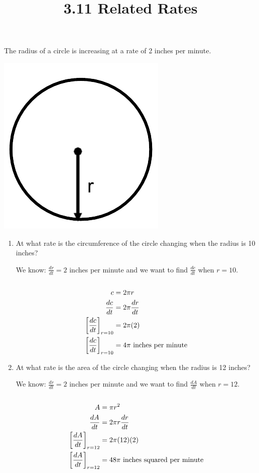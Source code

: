 \documentclass[nooutcomes,handout]{ximera}
\title{3.11 Related Rates}
\begin{document}
\begin{abstract}		\end{abstract}
\maketitle


\begin{problem}
The radius of a circle is increasing at a rate of 2 inches per minute. 
	\begin{image}
	\includegraphics[scale=.5]{Figure2.png}
	\end{image}

\begin{enumerate}
	\item At what rate is the circumference of the circle changing when the radius is 10 inches?
	\begin{freeResponse}
	We know: ${\frac{dr}{dt}}=2$ inches per minute and we want to find ${\frac{dc}{dt}}$ when $r=10$.\\\\
	\begin{align*}
	c&=2\pi r\\
	{\frac{dc}{dt}}&=2\pi {\frac{dr}{dt}}\\
	\bigg[ {\frac{dc}{dt}} \bigg]_{r=10}&=2 \pi (2)\\
	\bigg[ {\frac{dc}{dt}} \bigg]_{r=10}&=4 \pi\ \text{inches per minute}
	\end{align*}
	\end{freeResponse}
	\item At what rate is the area of the circle changing when the radius is 12 inches?
		\begin{freeResponse}
	We know: ${\frac{dr}{dt}}=2$ inches per minute and we want to find ${\frac{dA}{dt}}$ when $r=12$.\\\\
	\begin{align*}
	A&=\pi r^2\\
	{\frac{dA}{dt}}&=2\pi r{\frac{dr}{dt}}\\
	\bigg[ {\frac{dA}{dt}} \bigg]_{r=12}&=2 \pi (12)(2)\\
	\bigg[ {\frac{dA}{dt}} \bigg]_{r=12}&=48 \pi\ \text{inches squared per minute}
	\end{align*}
	\end{freeResponse}
\end{enumerate}

\end{problem}
\end{document}
